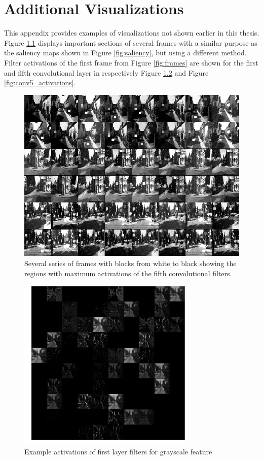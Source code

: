 \chapter{Additional Visualizations}
\label{app:additional_visualizations}
This appendix provides examples of visualizations not shown earlier in this thesis. Figure \ref{fig:activate_regions} displays important sections of several frames with a similar purpose as the saliency maps shown in Figure \ref{fig:saliency}, but using a different method. Filter activations of the first frame from Figure \ref{fig:frames} are shown for the first and fifth convolutional layer in respectively Figure \ref{fig:conv1_activations} and Figure \ref{fig:conv5_activations}. 

\begin{figure}[b!]
\centering
\includegraphics[width=\textwidth]{images/activated_regions.png}
\caption{Several series of frames with blocks from white to black showing the regions with maximum activations of the fifth convolutional filters.}
\label{fig:activate_regions}
\end{figure}

\begin{figure}
\centering
\includegraphics[width=0.75\textwidth]{images/conv1_activations_image1.png}
\caption{Example activations of first layer filters for grayscale feature}
\label{fig:conv1_activations}
\end{figure}

